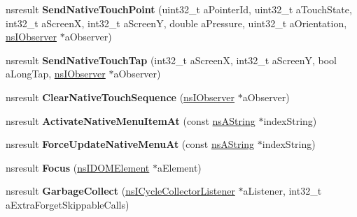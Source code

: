 \begin{DoxyCompactItemize}
\item 
\mbox{\label{interfacens_i_d_o_m_window_utils_a1f8fb7c209ff14989529c96dd020dfa6}} 
nsresult {\bfseries Send\+Native\+Touch\+Point} (uint32\+\_\+t a\+Pointer\+Id, uint32\+\_\+t a\+Touch\+State, int32\+\_\+t a\+ScreenX, int32\+\_\+t a\+ScreenY, double a\+Pressure, uint32\+\_\+t a\+Orientation, \hyperlink{interfacens_i_supports}{ns\+I\+Observer} $\ast$a\+Observer)
\item 
\mbox{\label{interfacens_i_d_o_m_window_utils_a5b5b61b98189b3310728c8922eecfbf2}} 
nsresult {\bfseries Send\+Native\+Touch\+Tap} (int32\+\_\+t a\+ScreenX, int32\+\_\+t a\+ScreenY, bool a\+Long\+Tap, \hyperlink{interfacens_i_supports}{ns\+I\+Observer} $\ast$a\+Observer)
\item 
\mbox{\label{interfacens_i_d_o_m_window_utils_a85dba469e8cdbf3843ede88e65d5ab23}} 
nsresult {\bfseries Clear\+Native\+Touch\+Sequence} (\hyperlink{interfacens_i_supports}{ns\+I\+Observer} $\ast$a\+Observer)
\item 
\mbox{\label{interfacens_i_d_o_m_window_utils_aa9e45a33bb1018258550dda76bc0afe3}} 
nsresult {\bfseries Activate\+Native\+Menu\+Item\+At} (const \hyperlink{structns_string_container}{ns\+A\+String} $\ast$index\+String)
\item 
\mbox{\label{interfacens_i_d_o_m_window_utils_ab661e15df2ac3f51b7c4c035d1a18d04}} 
nsresult {\bfseries Force\+Update\+Native\+Menu\+At} (const \hyperlink{structns_string_container}{ns\+A\+String} $\ast$index\+String)
\item 
\mbox{\label{interfacens_i_d_o_m_window_utils_a98ae99a3efb95db9ea5420c0a7527dd4}} 
nsresult {\bfseries Focus} (\hyperlink{interfacens_i_d_o_m_element}{ns\+I\+D\+O\+M\+Element} $\ast$a\+Element)
\item 
\mbox{\label{interfacens_i_d_o_m_window_utils_af7d35466e91cbc83345e323e7dc32d95}} 
nsresult {\bfseries Garbage\+Collect} (\hyperlink{interfacens_i_supports}{ns\+I\+Cycle\+Collector\+Listener} $\ast$a\+Listener, int32\+\_\+t a\+Extra\+Forget\+Skippable\+Calls)

\end{DoxyCompactItemize}
